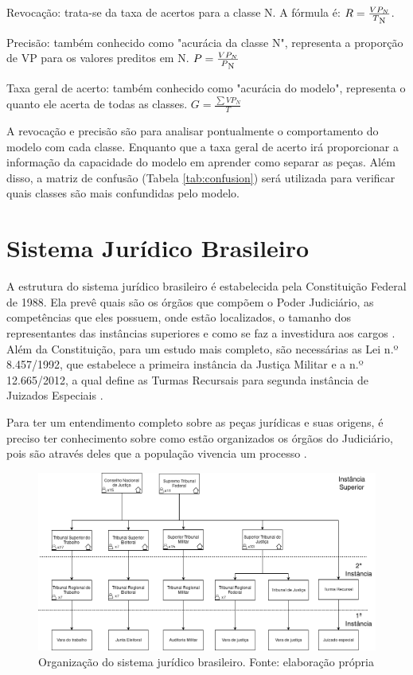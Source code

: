 \begin{description}
	\item Revocação: trata-se da taxa de acertos para a classe N. A fórmula é: $R = \frac{VP_{N}}{T\textsubscript{N}}$.
    \item Precisão: também conhecido como "acurácia da classe N", representa a proporção de VP para os valores preditos em N. $P = \frac{VP_{N}}{P\textsubscript{N}}$
    \item Taxa geral de acerto: também conhecido como "acurácia do modelo", representa o quanto ele acerta de todas as classes. $G = \frac{\sum{VP_{N}}}{T}$
\end{description}

A revocação e precisão são para analisar pontualmente o comportamento do modelo com cada classe. Enquanto que a taxa geral de acerto irá proporcionar a informação da capacidade do modelo em aprender como separar as peças. Além disso, a matriz de confusão (Tabela \ref{tab:confusion}) será utilizada para verificar quais classes são mais confundidas pelo modelo.

\section{Sistema Jurídico Brasileiro}

A estrutura do sistema jurídico brasileiro é estabelecida pela Constituição Federal de 1988. Ela prevê quais são os órgãos que compõem o Poder Judiciário, as competências que eles possuem, onde estão localizados, o tamanho dos representantes das instâncias superiores e como se faz a investidura aos cargos \cite{brasil_constituicao_1988}. Além da Constituição, para um estudo mais completo, são necessárias as Lei n.º 8.457/1992, que estabelece a primeira instância da Justiça Militar \cite{noauthor_lei_1992} e a n.º 12.665/2012, a qual define as Turmas Recursais para segunda instância de Juizados Especiais \cite{noauthor_lei_2012}.

Para ter um entendimento completo sobre as peças jurídicas e suas origens, é preciso ter conhecimento sobre como estão organizados os órgãos do Judiciário, pois são através deles que a população vivencia um processo \cite{amendoeira_jr_manual_2012}.

\begin{figure}[ht]
	\centering
    \includegraphics[keepaspectratio=true,scale=0.4]{figuras/sistemaJudiciario}
	\caption[Sistema judiciário]{Organização do sistema jurídico brasileiro. Fonte: elaboração própria}
	\label{fig:sistemaJudiciario}
\end{figure}

